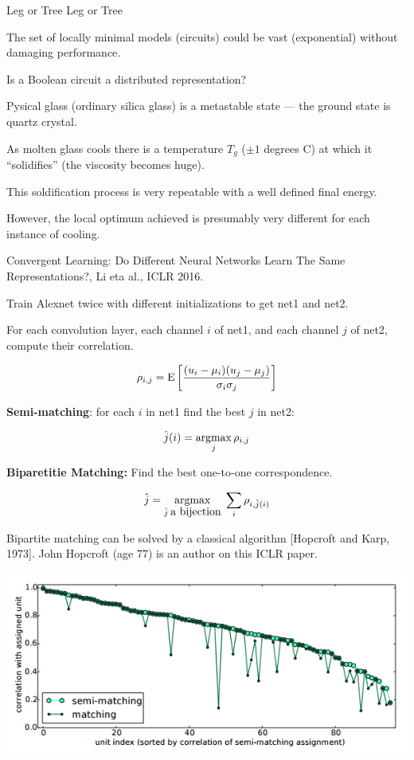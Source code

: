 {{\vfill
\centerline{Leg or Tree \hspace{1in} Leg or Tree}
}

\vfill
The set of locally minimal models (circuits) could be vast (exponential) without damaging performance.

\vfill
Is a Boolean circuit a distributed representation?


Pysical glass (ordinary silica glass) is a metastable state  --- the ground state is quartz crystal.

\vfill
As molten glass cools there is a temperature $T_g$ ($\pm 1$ degrees C) at which it ``solidifies'' (the viscosity becomes huge).

\vfill
This soldification process is very repeatable with a well defined final energy.

\vfill
However, the local optimum achieved is presumably very different for each instance of cooling.


Convergent Learning: Do Different Neural
Networks Learn The Same Representations?, Li eta al., ICLR 2016.

\vfill
Train Alexnet twice with different initializations to get net1 and net2.

\vfill
For each convolution layer, each channel $i$ of net1, and each channel $j$ of net2, compute their correlation.

\vfill
$$\rho_{i,j} = \mathrm{E}\left[\frac{(u_i - \mu_i)(u_j- \mu_j)}{\sigma_i \sigma_j}\right]$$


{\bf Semi-matching}: for each $i$ in net1 find the best $j$ in net2:

$$\hat{j}(i) = \operatorname*{argmax}_j \rho_{i,j}$$

\vfill
{\bf Biparetitie Matching:} Find the best one-to-one correspondence.

$$\hat{j} = \operatorname*{argmax}_{\hat{j}\;\mbox{a bijection}}\;\sum_i \rho_{i,\hat{j}(i)}$$

\vfill
Bipartite matching can be solved by a classical algorithm [Hopcroft and Karp, 1973].  John Hopcroft (age 77) is an author on this ICLR paper.


\centerline{\includegraphics[width = 9in]{../images/Correlations1}}


}
